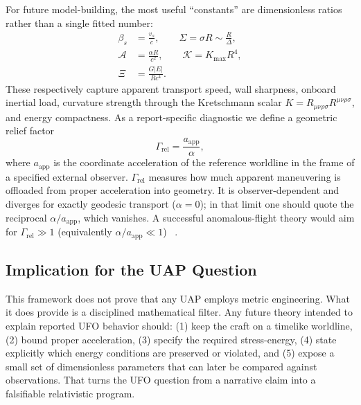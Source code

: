 \documentclass[aps,prd,twocolumn,superscriptaddress,nofootinbib,floatfix]{revtex4-2}
\begin{document}
For future model-building, the most useful ``constants'' are dimensionless
ratios rather than a single fitted number:
\begin{equation}
\begin{aligned}
\beta_s &= \frac{v_s}{c},\qquad
\Sigma = \sigma R \sim \frac{R}{\Delta},\\
\mathcal{A} &= \frac{\alpha R}{c^2},\qquad
\mathcal{K} = K_{\max}R^4,\\
\Xi &= \frac{G|E|}{R c^4}.
\end{aligned}
\label{eq:s09-dimensionless}
\end{equation}
These respectively capture apparent transport speed, wall sharpness, onboard
inertial load, curvature strength through the Kretschmann scalar
$K = R_{\mu\nu\rho\sigma}R^{\mu\nu\rho\sigma}$, and energy compactness. As a
report-specific diagnostic we define a geometric relief factor
\begin{equation}
\Gamma_{\mathrm{rel}} = \frac{a_{\mathrm{app}}}{\alpha},
\label{eq:s09-relief}
\end{equation}
where $a_{\mathrm{app}}$ is the coordinate acceleration of the reference worldline
in the frame of a specified external observer. $\Gamma_{\mathrm{rel}}$ measures how
much apparent maneuvering is offloaded from proper acceleration into geometry. It
is observer-dependent and diverges for exactly geodesic transport ($\alpha=0$); in
that limit one should quote the reciprocal $\alpha/a_{\mathrm{app}}$, which
vanishes. A successful anomalous-flight theory would aim for
$\Gamma_{\mathrm{rel}} \gg 1$ (equivalently $\alpha/a_{\mathrm{app}}\ll1$)%
~\cite{Alcubierre1994,PfenningFord1997,SantiagoVisser2022,BobrickMartire2021,MTW1973,Wald1984}.

\subsection{Implication for the UAP Question}\label{sec:uap-question}

This framework does not prove that any UAP employs metric engineering. What it
does provide is a disciplined mathematical filter. Any future theory intended to
explain reported UFO behavior should: (1) keep the craft on a timelike
worldline, (2) bound proper acceleration, (3) specify the required
stress-energy, (4) state explicitly which energy conditions are preserved or
violated, and (5) expose a small set of dimensionless parameters that can later
be compared against observations. That turns the UFO question from a narrative
claim into a falsifiable relativistic program.
\end{document}
